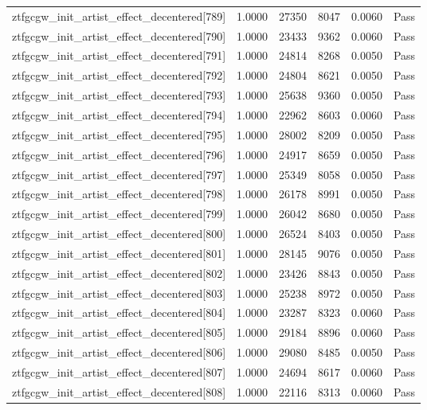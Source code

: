 \begin{table}[htbp]
\begin{tabular}{llrrll}
ztfgcgw\_init\_artist\_effect\_decentered[789] & 1.0000 & 27350 & 8047 & 0.0060 & Pass \\
ztfgcgw\_init\_artist\_effect\_decentered[790] & 1.0000 & 23433 & 9362 & 0.0060 & Pass \\
ztfgcgw\_init\_artist\_effect\_decentered[791] & 1.0000 & 24814 & 8268 & 0.0050 & Pass \\
ztfgcgw\_init\_artist\_effect\_decentered[792] & 1.0000 & 24804 & 8621 & 0.0050 & Pass \\
ztfgcgw\_init\_artist\_effect\_decentered[793] & 1.0000 & 25638 & 9360 & 0.0050 & Pass \\
ztfgcgw\_init\_artist\_effect\_decentered[794] & 1.0000 & 22962 & 8603 & 0.0060 & Pass \\
ztfgcgw\_init\_artist\_effect\_decentered[795] & 1.0000 & 28002 & 8209 & 0.0050 & Pass \\
ztfgcgw\_init\_artist\_effect\_decentered[796] & 1.0000 & 24917 & 8659 & 0.0050 & Pass \\
ztfgcgw\_init\_artist\_effect\_decentered[797] & 1.0000 & 25349 & 8058 & 0.0050 & Pass \\
ztfgcgw\_init\_artist\_effect\_decentered[798] & 1.0000 & 26178 & 8991 & 0.0050 & Pass \\
ztfgcgw\_init\_artist\_effect\_decentered[799] & 1.0000 & 26042 & 8680 & 0.0050 & Pass \\
ztfgcgw\_init\_artist\_effect\_decentered[800] & 1.0000 & 26524 & 8403 & 0.0050 & Pass \\
ztfgcgw\_init\_artist\_effect\_decentered[801] & 1.0000 & 28145 & 9076 & 0.0050 & Pass \\
ztfgcgw\_init\_artist\_effect\_decentered[802] & 1.0000 & 23426 & 8843 & 0.0050 & Pass \\
ztfgcgw\_init\_artist\_effect\_decentered[803] & 1.0000 & 25238 & 8972 & 0.0050 & Pass \\
ztfgcgw\_init\_artist\_effect\_decentered[804] & 1.0000 & 23287 & 8323 & 0.0060 & Pass \\
ztfgcgw\_init\_artist\_effect\_decentered[805] & 1.0000 & 29184 & 8896 & 0.0060 & Pass \\
ztfgcgw\_init\_artist\_effect\_decentered[806] & 1.0000 & 29080 & 8485 & 0.0050 & Pass \\
ztfgcgw\_init\_artist\_effect\_decentered[807] & 1.0000 & 24694 & 8617 & 0.0060 & Pass \\
ztfgcgw\_init\_artist\_effect\_decentered[808] & 1.0000 & 22116 & 8313 & 0.0060 & Pass \\

\end{tabular}
\end{table}
